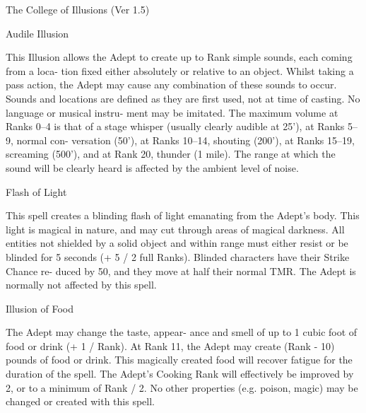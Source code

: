 \begin{Chapter}{The College of Illusions (Ver 1.5)}
\begin{spell}[G-1]{Audile Illusion }
\begin{effects}
This Illusion allows the Adept to create up 
to  Rank  simple  sounds,  each  coming  from  a  loca-
tion fixed either absolutely or relative to an object. 
Whilst  taking  a  pass  action,  the  Adept  may  cause 
any  combination  of these  sounds  to occur.  Sounds 
and locations are defined as they are first used, not 
at  time  of  casting.  No  language  or  musical  instru-
ment  may  be  imitated.  The  maximum  volume  at 
Ranks  0–4  is  that  of  a  stage  whisper  (usually 
clearly  audible  at  25’),  at  Ranks  5–9,  normal  con-
versation (50’), at Ranks 10–14, shouting (200’), at 
Ranks  15–19,  screaming  (500’),  and  at  Rank  20, 
thunder (1 mile). The range at which the sound will 
be clearly heard is affected by the ambient level of 
noise. 

\end{effects}
\end{spell}

\begin{spell}[G-2]{Flash of Light }

\begin{effects}
 This  spell  creates  a  blinding  flash  of  light 
emanating  from  the  Adept’s  body.  This  light  is 
magical  in  nature,  and  may  cut  through  areas  of 
magical  darkness.  All  entities  not  shielded  by  a 
solid  object  and  within  range  must  either  resist  or 
be  blinded  for  5  seconds  (+  5  /  2  full  Ranks). 
Blinded  characters  have  their  Strike  Chance  re-
duced  by  50,  and  they  move  at  half  their  normal 
TMR.  The  Adept  is  normally  not  affected  by  this 
spell. 



\end{effects}
\end{spell}

\begin{spell}[G-3]{Illusion of Food }

\begin{effects}
 The  Adept  may  change  the  taste,  appear-
ance  and  smell  of  up  to  1  cubic  foot  of  food  or 
drink  (+  1  /  Rank).  At  Rank  11,  the  Adept  may 
create  (Rank  -  10)  pounds  of  food  or  drink.  This 
magically created food will recover fatigue for the 
duration  of  the  spell.  The  Adept’s  Cooking  Rank 
will effectively be improved by 2, or to a minimum 
of  Rank  /  2.  No  other  properties  (e.g.  poison, 
magic) may be changed or created with this spell. 


\end{effects}
\end{spell}
\end{Chapter}
